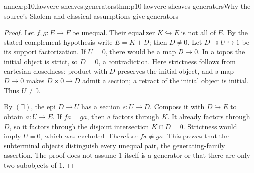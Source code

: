 \begin{annexitem}{annex:p10.lawvere-sheaves.generators}{thm:p10-lawvere-sheaves-generators}{Why the source's Skolem and classical assumptions give generators}
\begin{proof}
Let \(f,g:E\to F\) be unequal.  Their equalizer
\(K\hookrightarrow E\) is not all of \(E\).  By the stated
complement hypothesis write \(E=K+D\); then \(D\ne0\).
Let \(D\twoheadrightarrow U\hookrightarrow1\) be its support
factorization.  If \(U=0\), there would be a map \(D\to0\).
In a topos the initial object is strict, so \(D=0\), a
contradiction.  Here strictness follows from cartesian closedness:
product with \(D\) preserves the initial object, and a map
\(D\to0\) makes \(D\times0\to D\) admit a section; a
retract of the initial object is initial.  Thus \(U\ne0\).

By \((\exists)\), the epi \(D\to U\) has a section
\(s:U\to D\).  Compose it with \(D\hookrightarrow E\)
to obtain \(a:U\to E\).  If \(fa=ga\), then \(a\)
factors through \(K\).  It already factors through \(D\),
so it factors through the disjoint intersection \(K\cap D=0\).
Strictness would imply \(U=0\), which was excluded.  Therefore
\(fa\ne ga\).  This proves that the subterminal objects
distinguish every unequal pair, the generating-family assertion.
The proof does not assume \(1\) itself is a generator or that
there are only two subobjects of \(1\).
\end{proof}
\end{annexitem}

